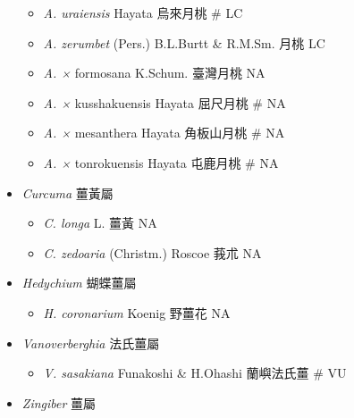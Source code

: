 \begin{itemize}
\begin{itemize}
        \item[] \textit{A. uraiensis} Hayata  烏來月桃  \# LC
        \item[] \textit{A. zerumbet} (Pers.) B.L.Burtt \& R.M.Sm.  月桃   LC
        \item[] \textit{A. ×} formosana \textit{} K.Schum.  臺灣月桃   NA
        \item[] \textit{A. ×} kusshakuensis \textit{} Hayata  屈尺月桃  \# NA
        \item[] \textit{A. ×} mesanthera \textit{} Hayata  角板山月桃  \# NA
        \item[] \textit{A. ×} tonrokuensis \textit{} Hayata  屯鹿月桃  \# NA
  \end{itemize}
 \item[] \textit{Curcuma} 薑黃屬
                                
  \begin{itemize}
        \item[] \textit{C. longa} L.  薑黃   NA
        \item[] \textit{C. zedoaria} (Christm.) Roscoe  莪朮   NA
  \end{itemize}
 \item[] \textit{Hedychium} 蝴蝶薑屬
                                
  \begin{itemize}
        \item[] \textit{H. coronarium} Koenig  野薑花   NA
  \end{itemize}
 \item[] \textit{Vanoverberghia} 法氏薑屬
                                
  \begin{itemize}
        \item[] \textit{V. sasakiana} Funakoshi \& H.Ohashi  蘭嶼法氏薑  \# VU
  \end{itemize}
 \item[] \textit{Zingiber} 薑屬
                                

\end{itemize}
